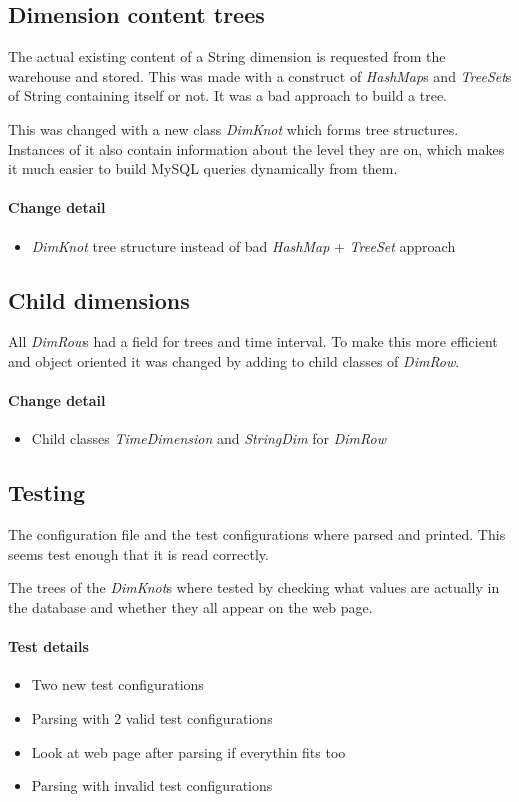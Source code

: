 \subsection{Dimension content trees}
The actual existing content of a String dimension is requested from
the warehouse and stored. This was made with a construct
of \textit{HashMap}s and \textit{TreeSet}s of String containing itself or not. It was
a bad approach to build a tree.

This was changed with a new class \textit{DimKnot} which forms tree structures. 
Instances of it also contain information about the level they are on,
which makes it much easier to build MySQL queries dynamically from them.
\paragraph{Change detail}
\begin{itemize}
  \item \textit{DimKnot} tree structure instead of bad \textit{HashMap} + \textit{TreeSet} approach
\end{itemize}



\subsection{Child dimensions}
All \textit{DimRow}s had a field for trees and time interval. To make this more
efficient and object oriented it was changed
by adding to child classes of \textit{DimRow}.
\paragraph{Change detail}
\begin{itemize}
  \item Child classes \textit{TimeDimension} and \textit{StringDim} for \textit{DimRow}
\end{itemize}

\subsection{Testing}

The configuration file and the test configurations where parsed and printed. 
This seems test enough that it is read correctly. 

The trees of the \textit{DimKnot}s where tested by checking what values are actually in the
database and whether they all appear on the web page.

\paragraph{Test details}
\begin{itemize}
  \item Two new test configurations
  \item Parsing with 2 valid test configurations
  \item Look at web page after parsing if everythin fits too
  \item Parsing with invalid test configurations
\end{itemize}


